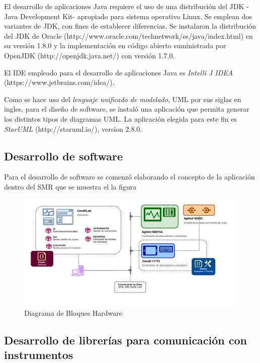 \documentclass[paper=letter,oneside,fontsize=12pt, parskip=full]{article}
\begin{document}
	El desarrollo de aplicaciones Java requiere el uso de una distribución del JDK -Java Development Kit- apropiado para sistema operativo Linux. Se emplean dos variantes de JDK, con fines de establecer diferencias. Se instalaron la distribución del JDK de Oracle (http://www.oracle.com/technetwork/es/java/index.html) en  su versión 1.8.0 y la implementación en código abierto  suministrada por OpenJDK (http://openjdk.java.net/) con versión 1.7.0.
	
	El IDE empleado para el desarrollo de aplicaciones Java es \emph{Intelli J IDEA} (https://www.jetbrains.com/idea/).
	
	Como se hace uso del \emph{lenguaje unificado de modelado}, UML por sus siglas en ingles, para el diseño de software, se instaló una aplicación que permita generar los distintos tipos de diagramas UML. La aplicación elegida para este fin es \emph{StarUML} (http://staruml.io/), version 2.8.0.
	
	\subsection{Desarrollo de software}
	
	Para el desarrollo de software se comenzó elaborando el concepto de la aplicación dentro del SMR que se muestra el la figura 
	
	\begin{figure}[!h]
		\begin{center}
			\includegraphics[width=18cm]{Imagenes/SystemMainDiagram.pdf}
			\caption{Diagrama de Bloques Hardware}
			\label{Fig:Diagrama de Bloques de Hardware}
		\end{center}
	\end{figure}	

	\subsection{Desarrollo de librerías para comunicación con instrumentos}
	
\end{document}
